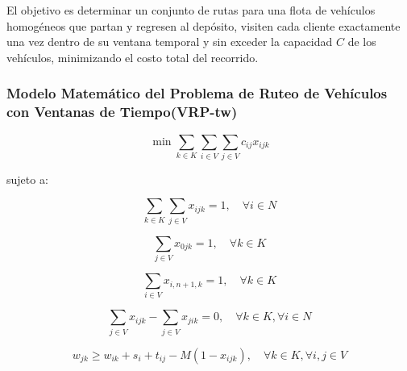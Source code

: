 \documentclass[12pt,titlepage,twoside,openright]{book}
\begin{document}
El objetivo es determinar un conjunto de rutas para una flota de vehículos homogéneos que partan y regresen al depósito, visiten cada cliente exactamente una vez dentro de su ventana temporal y sin exceder la capacidad \(C\) de los vehículos, minimizando el costo total del recorrido.

\subsubsection*{Modelo Matemático del Problema de Ruteo de Vehículos con Ventanas de Tiempo(VRP-tw)}

\begin{equation}
	\min \sum_{k \in K} \sum_{i \in V} \sum_{j \in V} c_{ij} x_{ijk}
	\label{eq:VRPTW_obj}
\end{equation}

sujeto a:

\begin{equation}
	\sum_{k \in K} \sum_{j \in V} x_{ijk} = 1, \quad \forall i \in N
	\label{eq:VRPTW_visit_once}
\end{equation}

\begin{equation}
	\sum_{j \in V} x_{0jk} = 1, \quad \forall k \in K
	\label{eq:VRPTW_start_depot}
\end{equation}

\begin{equation}
	\sum_{i \in V} x_{i,n+1,k} = 1, \quad \forall k \in K
	\label{eq:VRPTW_end_depot}
\end{equation}

\begin{equation}
	\sum_{j \in V} x_{ijk} - \sum_{j \in V} x_{jik} = 0, \quad \forall k \in K, \forall i \in N
	\label{eq:VRPTW_flow_balance}
\end{equation}

\begin{equation}
	w_{jk} \geq w_{ik} + s_i + t_{ij} - M (1 - x_{ijk}), \quad \forall k \in K, \forall i,j \in V
	\label{eq:VRPTW_time_window}
\end{equation}
\end{document}
